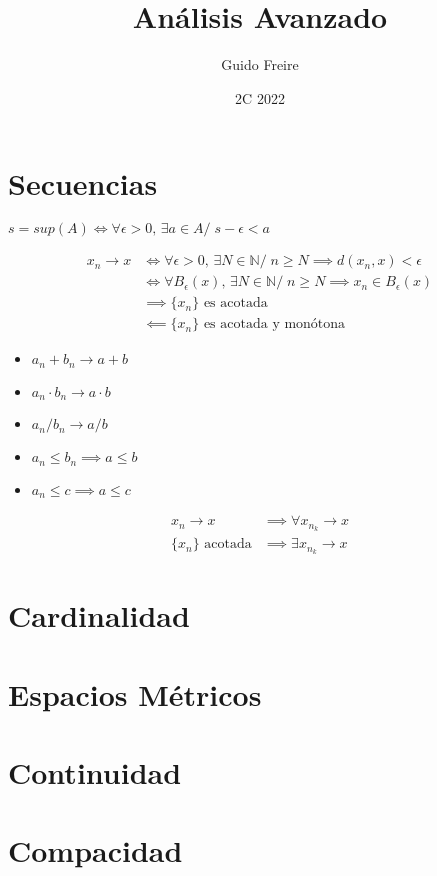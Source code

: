 \documentclass{article}
\title{An\'alisis Avanzado}
\author{Guido Freire}
\date{2C 2022}
\begin{document}
\maketitle

\section{Secuencias}
\begin{definicion}[Supremo]
    $s = sup(A) \iff \forall \epsilon > 0,\, \exists a \in A /\; s - \epsilon < a$
\end{definicion}
\begin{definicion}[Convergencia]
    \begin{align*}
        x_n \rightarrow x &\iff \forall \epsilon > 0,\, \exists N \in \mathbb{N} /\; n \geq N \implies d(x_n, x) < \epsilon\\
            &\iff \forall B_\epsilon(x),\, \exists N \in \mathbb{N} /\; n \geq N \implies x_n \in B_\epsilon(x)\\
            &\implies \{x_n\} \text{ es acotada}\\
            & \impliedby \{x_n\} \text{ es acotada y mon\'otona}
    \end{align*}
\end{definicion}
\begin{teorema}
    \begin{itemize}
    \item $a_n + b_n \rightarrow a + b$
    \item $a_n\cdot b_n \rightarrow a\cdot b$
    \item $a_n / b_n \rightarrow a/b$
    \end{itemize}
\end{teorema}
\begin{teorema}
    \begin{itemize}
        \item $a_n \leq b_n \implies a \leq b$
        \item $a_n \leq c \implies a \leq c$
        \end{itemize}
\end{teorema}
\begin{teorema}[Subsecuencias]
    \begin{align*}
        x_n \rightarrow x &\implies \forall x_{n_k} \rightarrow x\\
        \{x_n\} \text{ acotada} &\implies \exists x_{n_k} \rightarrow x
    \end{align*}
\end{teorema}

\section{Cardinalidad}

\section{Espacios M\'etricos}

\section{Continuidad}

\section{Compacidad}
\end{document}
